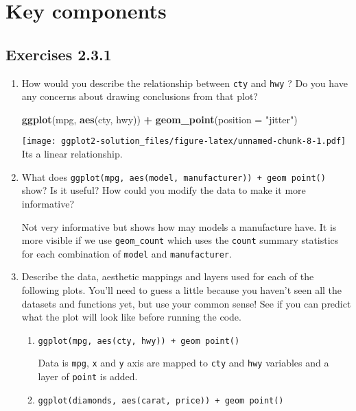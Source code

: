 \documentclass[]{book}
\newenvironment{Shaded}{\begin{snugshade}}{\end{snugshade}}
\newcommand{\KeywordTok}[1]{\textcolor[rgb]{0.13,0.29,0.53}{\textbf{#1}}}
\newcommand{\DataTypeTok}[1]{\textcolor[rgb]{0.13,0.29,0.53}{#1}}
\newcommand{\StringTok}[1]{\textcolor[rgb]{0.31,0.60,0.02}{#1}}
\newcommand{\OperatorTok}[1]{\textcolor[rgb]{0.81,0.36,0.00}{\textbf{#1}}}
\newcommand{\NormalTok}[1]{#1}
\begin{document}
\section{Key components}\label{key-components}

\subsection{Exercises 2.3.1}\label{exercises-2.3.1}

\begin{enumerate}
\def\labelenumi{\arabic{enumi}.}
\item
  How would you describe the relationship between \texttt{cty} and
  \texttt{hwy} ? Do you have any concerns about drawing conclusions from
  that plot?

\begin{Shaded}
\begin{Highlighting}[]
\KeywordTok{ggplot}\NormalTok{(mpg, }\KeywordTok{aes}\NormalTok{(cty, hwy)) }\OperatorTok{+}\StringTok{ }\KeywordTok{geom_point}\NormalTok{(}\DataTypeTok{position =} \StringTok{"jitter"}\NormalTok{)}
\end{Highlighting}
\end{Shaded}

  \texttt{[image: ggplot2-solution\_files/figure-latex/unnamed-chunk-8-1.pdf]}
  Its a linear relationship.
\item
  What does
  \texttt{ggplot(mpg,\ aes(model,\ manufacturer))\ +\ geom\ point()}
  show? Is it useful? How could you modify the data to make it more
  informative?

  Not very informative but shows how may models a manufacture have. It
  is more visible if we use \texttt{geom\_count} which uses the
  \texttt{count} summary statistics for each combination of
  \texttt{model} and \texttt{manufacturer}.
\item
  Describe the data, aesthetic mappings and layers used for each of the
  following plots. You'll need to guess a little because you haven't
  seen all the datasets and functions yet, but use your common sense!
  See if you can predict what the plot will look like before running the
  code.

  \begin{enumerate}
  \def\labelenumii{\alph{enumii}.}
  \item
    \texttt{ggplot(mpg,\ aes(cty,\ hwy))\ +\ geom\ point()}

    Data is \texttt{mpg}, \texttt{x} and \texttt{y} axis are mapped to
    \texttt{cty} and \texttt{hwy} variables and a layer of
    \texttt{point} is added.
  \item
    \texttt{ggplot(diamonds,\ aes(carat,\ price))\ +\ geom\ point()}


\end{enumerate}
\end{enumerate}
\end{document}
